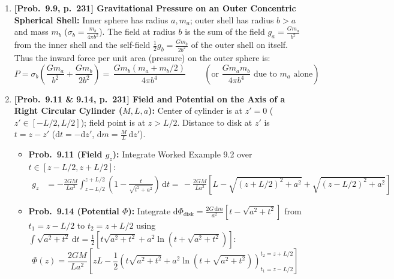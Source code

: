 \documentclass[11pt,a4paper,openany,oneside]{book}
\newcommand{\eqbox}[1]{\boxed{\,#1\,}}
\newcommand{\dd}{\,\mathrm{d}}
\newcommand{\diff}{\mathrm{d}}
\numberwithin{equation}{chapter}
\begin{document}
\begin{enumerate}[label=\textbf{Prob.\ 9.\arabic*},leftmargin=4.2em]
  \item \textbf{[Prob.\ 9.9, p.\ 231] Gravitational Pressure on an Outer Concentric Spherical Shell:}
  Inner sphere has radius $a, m_a$; outer shell has radius $b > a$ and mass $m_b$ ($\sigma_b = \frac{m_b}{4\pi b^2}$). The field at radius $b$ is the sum of the field $g_a = \frac{Gm_a}{b^2}$ from the inner shell and the self-field $\frac{1}{2}g_b = \frac{Gm_b}{2b^2}$ of the outer shell on itself. Thus the inward force per unit area (pressure) on the outer sphere is:
  \begin{equation*}
    P = \sigma_b\!\left(\frac{Gm_a}{b^2} + \frac{Gm_b}{2b^2}\right) = \eqbox{\frac{Gm_b(m_a + m_b/2)}{4\pi b^4}} \qquad \left(\text{or }\frac{Gm_a m_b}{4\pi b^4}\text{ due to }m_a\text{ alone}\right)
  \end{equation*}

  \setcounter{enumi}{10}
  \item \textbf{[Prob.\ 9.11 \& 9.14, p.\ 231] Field and Potential on the Axis of a Right Circular Cylinder ($M, L, a$):}
  Center of cylinder is at $z'=0$ ($z'\in [-L/2, L/2]$); field point is at $z > L/2$. Distance to disk at $z'$ is $t = z - z'$ ($\diff t = -\diff z'$, $\diff m = \frac{M}{L}\dd z'$).
  \begin{itemize}
    \item \textbf{Prob.\ 9.11 (Field $g_z$):} Integrate Worked Example 9.2 over $t\in [z-L/2, z+L/2]$:
    \begin{align*}
      g_z &= -\frac{2GM}{La^2}\int_{z-L/2}^{z+L/2}\left(1 - \frac{t}{\sqrt{t^2+a^2}}\right)\dd t = \eqbox{-\frac{2GM}{La^2}\!\left[L - \sqrt{(z+L/2)^2+a^2} + \sqrt{(z-L/2)^2+a^2}\right]}
    \end{align*}
    \item \textbf{Prob.\ 9.14 (Potential $\Phi$):} Integrate $\diff\Phi_{\text{disk}} = \frac{2G\dd m}{a^2}\!\left[t - \sqrt{a^2+t^2}\right]$ from $t_1 = z - L/2$ to $t_2 = z + L/2$ using $\int\sqrt{a^2+t^2}\dd t = \frac{1}{2}\!\left[t\sqrt{a^2+t^2} + a^2\ln\!\left(t+\sqrt{a^2+t^2}\right)\right]$:
    \begin{equation*}
      \eqbox{\Phi(z) = \frac{2GM}{La^2}\!\left[zL - \frac{1}{2}\!\left(t\sqrt{a^2+t^2} + a^2\ln\!\left(t+\sqrt{a^2+t^2}\right)\right)_{t_1 = z-L/2}^{t_2 = z+L/2}\right]}
    \end{equation*}
  \end{itemize}


\end{enumerate}
\end{document}
